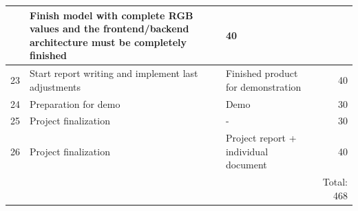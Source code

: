 \documentclass[a4paper,onecolumn]{report}
\begin{document}
\begin{center}
\begin{tabular}{| l | p{5cm}| p{5cm} | r | }
\begin{itemize}
	\end{itemize} & Finish model with complete RGB values and the frontend/backend architecture must be completely finished & 40 					\\  \hline
	23 & Start report writing and implement last adjustments & Finished product for demonstration & 40 	\\	\hline
	24 & Preparation for demo & Demo & 30				\\  \hline
    25 & Project finalization & - & 30 				\\ \hline
    26 & Project finalization & Project report + individual document & 40 \\ \hline
       & & & Total: 468  \\ \hline

    \hline
  \end{tabular}
\end{center}
\end{document}

